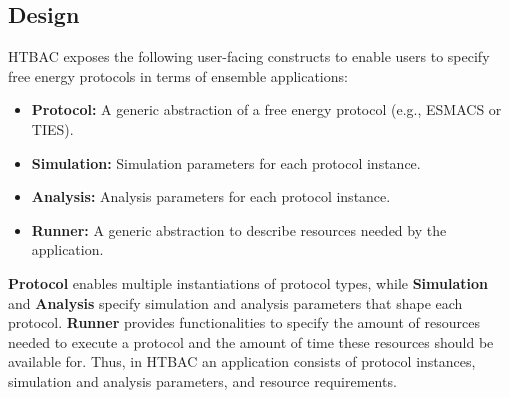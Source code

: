 



\subsection{Design}

HTBAC exposes the following user-facing constructs to enable users to specify
free energy protocols in terms of ensemble applications:

\begin{itemize}
  \item \textbf{Protocol:} A generic abstraction of a free energy protocol
  (e.g., ESMACS or TIES).
  \item \textbf{Simulation:} Simulation parameters for each protocol
  instance.
  \item \textbf{Analysis:} Analysis parameters for each protocol instance.
  \item \textbf{Runner:} A generic abstraction to describe resources needed
  by the application.
\end{itemize}

\textbf{Protocol} enables multiple instantiations of protocol types, while
\textbf{Simulation} and \textbf{Analysis} specify simulation and analysis
parameters that shape each protocol. \textbf{Runner} provides functionalities
to specify the amount of resources needed to execute a protocol and the
amount of time these resources should be available for. Thus, in HTBAC an
application consists of protocol instances, simulation and analysis
parameters, and resource requirements.

